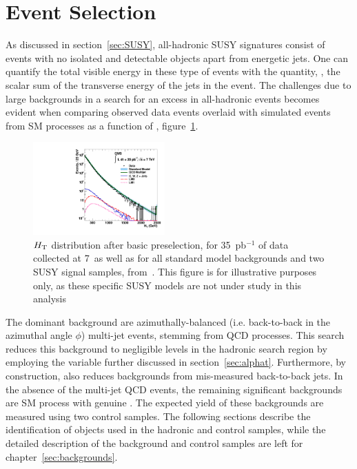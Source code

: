 \clearpage
\section{Event Selection\label{sec:eventSelection}}

As discussed in section~\ref{sec:SUSY}, all-hadronic SUSY signatures consist of events with
no isolated and detectable objects apart from energetic jets. One can quantify the
total visible energy in these type of events with the quantity, \scalht, the scalar sum of 
the transverse energy of the jets in the event. The challenges due to large
backgrounds in a search for an excess in all-hadronic events becomes evident 
when comparing observed data events overlaid with simulated events from 
SM processes as a function of \scalht, figure~\ref{fig:HT-distribution}.

\begin{figure}[h!t]
  \begin{center}
      \includegraphics[width=0.45\textwidth,]{figures/data-mc/AllcombinedHT_all.pdf}
      \caption{\label{fig:ht} $\mbox{$H_\text{T}$}$ distribution after basic preselection,
           for 35~pb$^{-1}$ of data collected at {7}~\tev as well as for all 
           standard model backgrounds and two SUSY signal samples, from~\cite{RA1Paper}. 
           This figure is for illustrative purposes only, as these specific SUSY 
           models are not under study in this analysis}
    \label{fig:HT-distribution}
  \end{center}
\end{figure}

The dominant background are azimuthally-balanced (i.e. back-to-back in the azimuthal angle 
$\phi$) multi-jet events, stemming from QCD processes. This search reduces this background 
to negligible levels in the hadronic search region by employing the \alphat variable further 
discussed in section~\ref{sec:alphat}. Furthermore, by construction, \alphat also reduces 
backgrounds from mis-measured back-to-back jets. In the absence of the multi-jet QCD events,
the remaining significant backgrounds are SM process with genuine \met. The expected 
yield of these backgrounds are measured using two control samples. The following sections
describe the identification of objects used in the hadronic and control samples, while the 
detailed description of the background and control samples are left for 
chapter~\ref{sec:backgrounds}.

